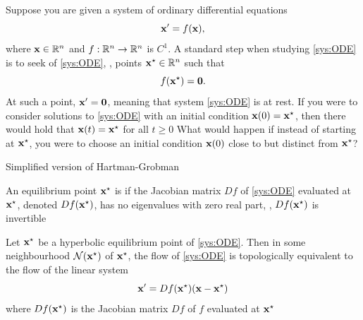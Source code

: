 \documentclass[aspectratio=169]{beamer}
\begin{document}
\begin{frame}
Suppose you are given a system of ordinary differential equations
\begin{equation}\label{sys:ODE}
\mathbf{x}'=f(\mathbf{x}),
\end{equation}
where $\mathbf{x}\in\mathbb{R}^n$ and $f:\mathbb{R}^n\to\mathbb{R}^n$ is $C^1$. A standard step when studying \eqref{sys:ODE}  is to seek  of \eqref{sys:ODE}, \ie, points $\mathbf{x}^\star\in\mathbb{R}^n$ such that
\begin{equation}\label{eq:equilibrium}
f(\bx^\star)=\b0.
\end{equation}
At such a point, $\bx'=\b0$, meaning that system \eqref{sys:ODE} is at rest. If you were to consider solutions to \eqref{sys:ODE} with an initial condition $\mathbf{x}(0)=\mathbf{x}^\star$, then there would hold that $\mathbf{x}(t)=\mathbf{x}^\star$ for all $t\geq 0$
\vfill
What would happen if instead of starting at $\mathbf{x}^\star$, you were to choose an initial condition $\mathbf{x}(0)$ close to but distinct from $\mathbf{x}^\star$?
\end{frame}

\begin{frame}{Simplified version of Hartman-Grobman}
\begin{definition}
An equilibrium point $\mathbf{x}^\star$ is  if the Jacobian matrix $Df$ of \eqref{sys:ODE} evaluated at $\mathbf{x}^\star$, denoted $Df(\mathbf{x}^\star)$, has no eigenvalues with zero real part, \ie, $Df(\mathbf{x}^\star)$ is invertible
\end{definition}
\vfill
\begin{theorem}\label{th:HartmanGrobman}
Let $\mathbf{x}^\star$ be a hyperbolic equilibrium point of \eqref{sys:ODE}.
Then in some neighbourhood $\mathcal{N}(\mathbf{x}^\star)$ of $\mathbf{x}^\star$, the flow of \eqref{sys:ODE} is topologically equivalent to the flow of the linear system 
\begin{equation}\label{sys:linearized}
\mathbf{x}'=Df(\mathbf{x}^\star)(\mathbf{x}-\mathbf{x}^\star)
\end{equation} 
where $Df(\mathbf{x}^\star)$ is the Jacobian matrix $Df$ of $f$ evaluated at $\mathbf{x}^\star$
\end{theorem}
\end{frame}
\end{document}
